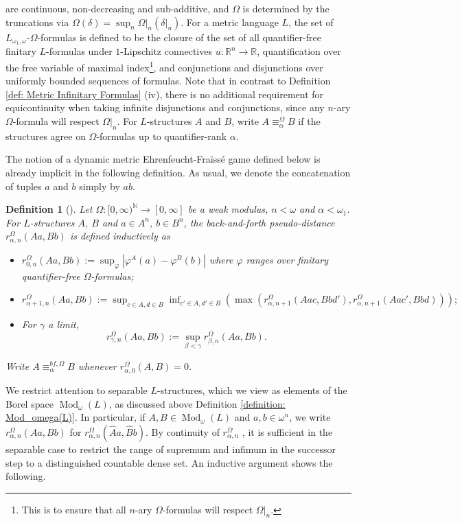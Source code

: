 \documentclass[12pt]{amsart}
\newtheorem{definition}[theorem]{Definition}
\DeclareMathOperator{\Mod}{Mod}
\begin{document}
are continuous, non-decreasing and sub-additive, and $\Omega$ is determined by the truncations via $\Omega(\delta)=\sup_n\Omega|_n(\delta|_n)$. For a metric language $L$, the set of $L_{\omega_1, \omega}$-$\Omega$-formulas is defined to be the closure of the set of all quantifier-free finitary $L$-formulas under $1$-Lipschitz connectives $u \colon \mathbb R^n\to\mathbb R$, quantification over the free variable of maximal index\footnote{This is to ensure that all $n$-ary $\Omega$-formulas will respect $\Omega|_n$.}, and conjunctions and disjunctions over uniformly bounded sequences of formulas. Note that in contrast to Definition \ref{def: Metric Infinitary Formulas} (iv), there is no additional requirement for equicontinuity when taking infinite disjunctions and conjunctions, since any $n$-ary $\Omega$-formula will respect $\Omega|_n$. For $L$-structures $A$ and $B$, write $A\equiv_\alpha^\Omega B$ if the structures agree on $\Omega$-formulas up to quantifier-rank $\alpha$.

The notion of a dynamic metric Ehrenfeucht-Fra\"iss\'e game defined below is already implicit in the following definition. 
As usual, we denote the concatenation of tuples $a$ and $b$ simply by $ab$.

\begin{definition}[{\cite[Definition 3.1]{yaacov2017metric}}] \label{definition:back-and-forth-distance}
    Let $\Omega \colon [0,\infty)^{\mathbb N}\to[0,\infty]$ be a weak modulus, $n<\omega$ and $\alpha<\omega_1$. For $L$-structures $A$, $B$ and $a\in A^n$, $b\in B^n$, the {back-and-forth pseudo-distance} $r_{\alpha,n}^\Omega(Aa,Bb)$ is defined inductively as
    \begin{itemize}
        \item $r_{0,n}^{\Omega}(Aa,Bb):=\sup_\varphi|\varphi^{A}(a)-\varphi^{B}(b)|$
        where $\varphi$ ranges over finitary quantifier-free $\Omega$-formulas;
        \item $r_{\alpha+1,n}^{\Omega}(Aa,Bb):=\sup_{c\in A,d\in B}\inf_{c'\in A,d'\in B}(\max(r^\Omega_{\alpha,n+1}(Aac,Bbd'),r^\Omega_{\alpha,n+1}(Aac',Bbd)));$
        \item For $\gamma$ a limit, 
        \[r^\Omega_{\gamma,n}(Aa,Bb):=\sup_{\beta<\gamma}r_{\beta,n}^\Omega(Aa,Bb).\]
    \end{itemize}
    Write $A\equiv_\alpha^{bf,\Omega}B$ whenever $r_{\alpha,0}^\Omega(A,B)=0$.
\end{definition}

We restrict attention to separable $L$-structures, which we view as elements of the Borel space $\Mod_\omega(L)$, as discussed above Definition \ref{definition: Mod_omega(L)}. 
In particular, if $A,B \in \Mod_{\omega}(L)$ and $a,b\in\omega^n$, we write $r_{\alpha,n}^\Omega(Aa,Bb)$ for $r_{\alpha,n}^\Omega(\widehat{A}a,\widehat{B}b)$.
By continuity of $r_{\alpha,n}^\Omega$ \cite[Lemma 3.2]{yaacov2017metric}, it is sufficient in the separable case to restrict the range of supremum and infimum in the successor step to a distinguished countable dense set.
An inductive argument shows the following. 
\end{document}

